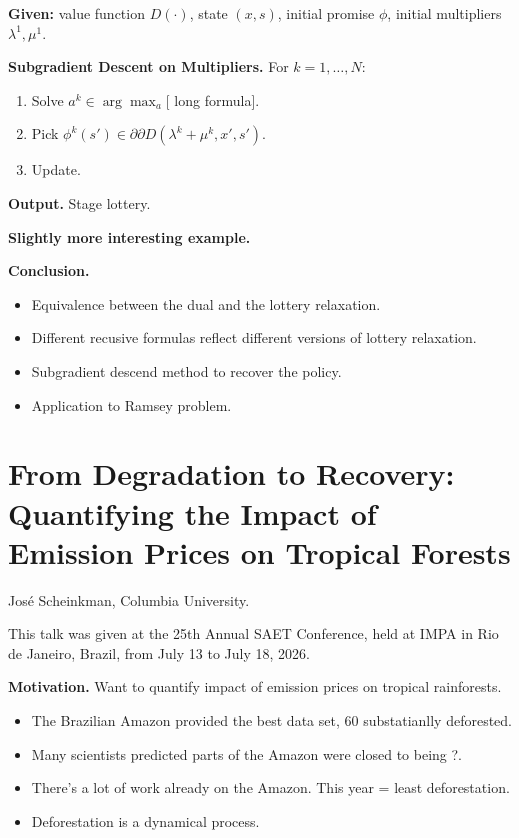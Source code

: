 \noindent
{\bf Given:} value function $D(\cdot)$,
state $(x,s)$, initial promise
$\phi$, initial multipliers
$\lambda^1, \mu^1$.

\noindent
{\bf Subgradient Descent on Multipliers.} 
For $k=1,…,N$:
\begin{enumerate}
\item Solve $a^k \in \operatorname{arg}
\operatorname{max}_a[$ long formula].
\item Pick $\phi^k(s') \in \partial
\partial D(\lambda^k+\mu^k,x',s')$.
\item Update.
\end{enumerate}

\noindent
{\bf Output.} Stage lottery.

\medskip\noindent
{\bf Slightly more interesting example.}

\medskip\noindent
{\bf Conclusion.}
\begin{itemize}
\item Equivalence between the dual and the
lottery relaxation.
\item Different recusive formulas
reflect different versions of lottery
relaxation.
\item Subgradient descend method
to recover the policy.
\item Application to Ramsey problem.
\end{itemize}

\section{From Degradation to Recovery:
Quantifying the Impact of Emission
Prices on Tropical Forests}
\label{section-tropical-forests-scheinkman}

\medskip\noindent
José Scheinkman,
Columbia University.

\medskip\noindent
This talk was given at the 25th Annual
SAET Conference, held at IMPA in Rio de
Janeiro, Brazil, from July 13 to
July 18, 2026.

\medskip\noindent
{\bf Motivation.}
Want to quantify impact of emission prices
on tropical rainforests.

\begin{itemize}
\item The 
Brazilian Amazon provided the best data set,
60%
substatianlly deforested.

\item Many scientists predicted parts of the
Amazon were closed to being ?.

\item There's a lot of work already on the
Amazon.
This year = least deforestation.

\item Deforestation is a dynamical process.
\end{itemize}

